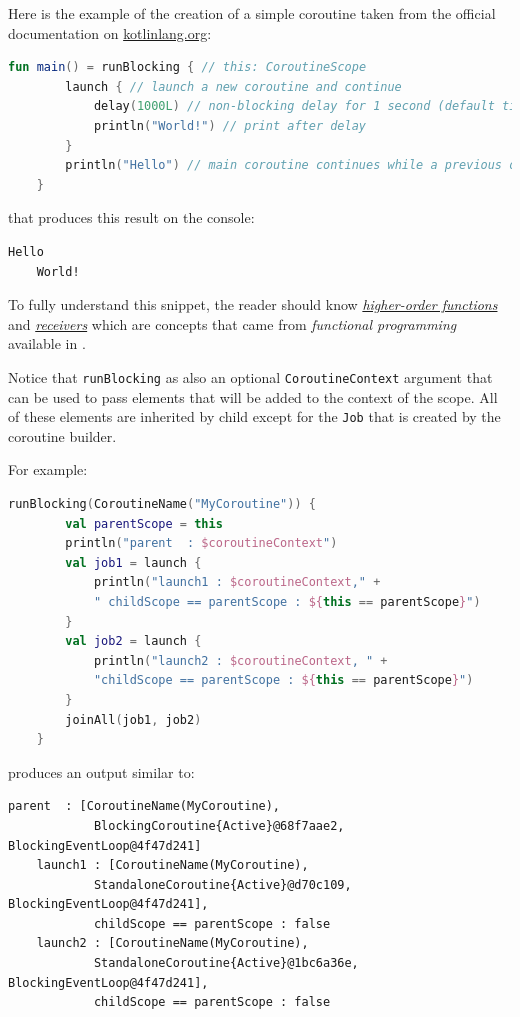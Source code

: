 Here is the example of the creation of a simple coroutine taken from the official documentation on \href{https://kotlinlang.org/docs/coroutines-basics.html#your-first-coroutine}{kotlinlang.org}:
\begin{lstlisting}[language=kotlin]
	fun main() = runBlocking { // this: CoroutineScope
		launch { // launch a new coroutine and continue
			delay(1000L) // non-blocking delay for 1 second (default time unit is ms)
			println("World!") // print after delay
		}
		println("Hello") // main coroutine continues while a previous one is delayed
	}
\end{lstlisting}

that produces this result on the console:
\begin{lstlisting}[numbers=none]
	Hello
	World!
\end{lstlisting}

To fully understand this snippet, the reader should know \href{https://kotlinlang.org/docs/lambdas.html#higher-order-functions}{\textit{higher-order functions}} and \href{https://kotlinlang.org/docs/lambdas.html#function-types}{\textit{receivers}} which are concepts that came from \textit{functional programming} available in \Kotlin.

Notice that \texttt{runBlocking} as also an optional \texttt{CoroutineContext} argument that can be used to pass elements that will be added to the context of the scope. All of these elements are inherited by child except for the \texttt{Job} that is created by the coroutine builder.

For example:
\begin{lstlisting}[language=Kotlin]
	runBlocking(CoroutineName("MyCoroutine")) {
		val parentScope = this
		println("parent  : $coroutineContext")
		val job1 = launch {
			println("launch1 : $coroutineContext," +
			" childScope == parentScope : ${this == parentScope}")
		}
		val job2 = launch {
			println("launch2 : $coroutineContext, " +
			"childScope == parentScope : ${this == parentScope}")
		}
		joinAll(job1, job2)
	}
\end{lstlisting}
produces an output similar to:
\begin{lstlisting}[numbers=none]
	parent  : [CoroutineName(MyCoroutine),
			BlockingCoroutine{Active}@68f7aae2, BlockingEventLoop@4f47d241]
	launch1 : [CoroutineName(MyCoroutine),
			StandaloneCoroutine{Active}@d70c109, BlockingEventLoop@4f47d241],
			childScope == parentScope : false
	launch2 : [CoroutineName(MyCoroutine),
			StandaloneCoroutine{Active}@1bc6a36e, BlockingEventLoop@4f47d241],
			childScope == parentScope : false
\end{lstlisting}

